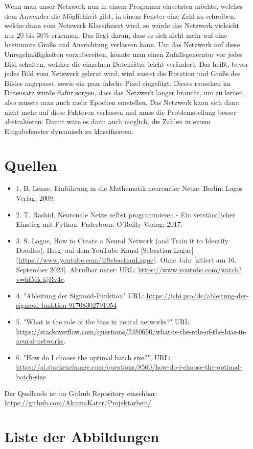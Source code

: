 \documentclass[12pt]{article}
\begin{document}
Wenn man unser Netzwerk nun in einem Programm einsetzten möchte, welches dem Anwender die Möglichkeit gibt, in einem Fenster eine Zahl zu schreiben, welche dann vom Netzwerk Klassifiziert wird, so würde das Netzwerk vieleicht nur 20 bis 30\% erkennen. Das liegt daran, dass es sich nicht mehr auf eine bestimmte Größe und Ausrichtung verlassen kann. Um das Netzwerk auf diese Unregelmäßigkeiten vorzubereiten, könnte man einen Zufallsgenerator vor jedes Bild schalten, welcher die einzelnen Datensätze leicht verändert. Das heißt, bevor jedes Bild vom Netzwerk gelernt wird, wird zuerst die Rotation und Größe des Bildes angepasst, sowie ein paar falsche Pixel eingefügt. Dieses rauschen im Datensatz würde dafür sorgen, dass das Netzwerk länger braucht, um zu lernen, also müsste man auch mehr Epochen einstellen. Das Netzwerk kann sich dann nicht mehr auf diese Faktoren verlassen und muss die Problemstellung besser abstrahieren. Damit wäre es dann auch möglich, die Zahlen in einem Eingabefenster dynamisch zu klassifizieren.\\


\cleardoublepage
\sloppy
\section{Quellen}
\begin{itemize}
\item 1. B. Lenze, Einführung in die Mathematik neuronaler Netze. Berlin: Logos Verlag; 2009.
\item 2. T. Rashid, Neuronale Netze selbst programmieren - Ein verständlicher Einstieg mit Python. Paderborn: O’Reilly Verlag; 2017.
\item 3. S. Lague, How to Create a Neural Network (and Train it to Identify Doodles). Hrsg. auf dem YouTube Kanal [Sebastian Lague](\url{https://www.youtube.com/@SebastianLague}). Ohne Jahr [zitiert am 16. September 2023]. Abrufbar unter: URL: \url{https://www.youtube.com/watch?v=hfMk-kjRv4c}.
\item 4. "Ableitung der Sigmoid-Funktion" URL: \url{https://ichi.pro/de/ableitung-der-sigmoid-funktion-91708302791054}
\item 5. "What is the role of the bias in neural networks?" URL: \url{https://stackoverflow.com/questions/2480650/what-is-the-role-of-the-bias-in-neural-networks}.
\item 6. "How do I choose the optimal batch size?", URL: \url{https://ai.stackexchange.com/questions/8560/how-do-i-choose-the-optimal-batch-size}
\end{itemize}
Der Quellcode ist im Github Repository einsehbar:\\
\url{https://github.com/AkumaKater/Projektarbeit/}

\cleardoublepage
\section{Liste der Abbildungen}
\listoffigures
\end{document}
